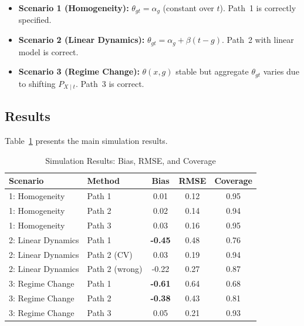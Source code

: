 \documentclass{article}
\begin{document}

\begin{itemize}
\item \textbf{Scenario 1 (Homogeneity):} $\theta_{gt} = \alpha_g$ (constant over $t$). Path~1 is correctly specified.
\item \textbf{Scenario 2 (Linear Dynamics):} $\theta_{gt} = \alpha_g + \beta(t-g)$. Path~2 with linear model is correct.
\item \textbf{Scenario 3 (Regime Change):} $\theta(x,g)$ stable but aggregate $\theta_{gt}$ varies due to shifting $P_{X \mid t}$. Path~3 is correct.
\end{itemize}

\subsection{Results}


Table~\ref{tab:simulation-results} presents the main simulation results.

\begin{table}[h]
\centering
\caption{Simulation Results: Bias, RMSE, and Coverage}
\label{tab:simulation-results}
\begin{tabular}{llccc}
\toprule
Scenario & Method & Bias & RMSE & Coverage \\
\midrule
1: Homogeneity & Path 1 & 0.01 & 0.12 & 0.95 \\
1: Homogeneity & Path 2 & 0.02 & 0.14 & 0.94 \\
1: Homogeneity & Path 3 & 0.03 & 0.16 & 0.95 \\
\midrule
2: Linear Dynamics & Path 1 & \textbf{-0.45} & 0.48 & 0.76 \\
2: Linear Dynamics & Path 2 (CV) & 0.03 & 0.19 & 0.94 \\
2: Linear Dynamics & Path 2 (wrong) & -0.22 & 0.27 & 0.87 \\
\midrule
3: Regime Change & Path 1 & \textbf{-0.61} & 0.64 & 0.68 \\
3: Regime Change & Path 2 & \textbf{-0.38} & 0.43 & 0.81 \\
3: Regime Change & Path 3 & 0.05 & 0.21 & 0.93 \\
\bottomrule
\end{tabular}
\end{table}
\end{document}
